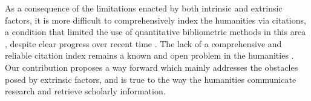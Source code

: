 As a consequence of the limitations enacted by both intrinsic and extrinsic factors, it is more difficult to comprehensively index the humanities via citations, a condition that limited the use of quantitative bibliometric methods in this area \cite{ardanuy_sixty_2013}, despite clear progress over recent time \cite{petr_journal_2021, hammarfelt_beyond_2016}. The lack of a comprehensive and reliable citation index remains a known and open problem in the humanities \cite{heinzkill_characteristics_1980, linmans_why_2009, sula_citations_2014}. Our contribution proposes a way forward which mainly addresses the obstacles posed by extrinsic factors, and is true to the way the humanities communicate research and retrieve scholarly information.